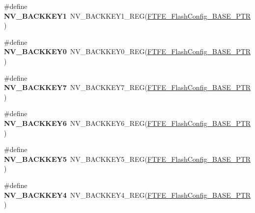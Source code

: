 \begin{DoxyCompactItemize}
\item 
\hypertarget{group___n_v___register___accessor___macros_gae849f8e6eaa76305b07c567463074dc9}{}\#define {\bfseries N\+V\+\_\+\+B\+A\+C\+K\+K\+E\+Y1}~N\+V\+\_\+\+B\+A\+C\+K\+K\+E\+Y1\+\_\+\+R\+E\+G(\hyperlink{group___n_v___peripheral_ga824c84d1d5dcc180128d85f4f676b4c5}{F\+T\+F\+E\+\_\+\+Flash\+Config\+\_\+\+B\+A\+S\+E\+\_\+\+P\+T\+R})\label{group___n_v___register___accessor___macros_gae849f8e6eaa76305b07c567463074dc9}

\item 
\hypertarget{group___n_v___register___accessor___macros_gadb8e2eb4db4de2a485b31c2a1dd393af}{}\#define {\bfseries N\+V\+\_\+\+B\+A\+C\+K\+K\+E\+Y0}~N\+V\+\_\+\+B\+A\+C\+K\+K\+E\+Y0\+\_\+\+R\+E\+G(\hyperlink{group___n_v___peripheral_ga824c84d1d5dcc180128d85f4f676b4c5}{F\+T\+F\+E\+\_\+\+Flash\+Config\+\_\+\+B\+A\+S\+E\+\_\+\+P\+T\+R})\label{group___n_v___register___accessor___macros_gadb8e2eb4db4de2a485b31c2a1dd393af}

\item 
\hypertarget{group___n_v___register___accessor___macros_gaf4c4eb8173a514a0fe632f29e80423d4}{}\#define {\bfseries N\+V\+\_\+\+B\+A\+C\+K\+K\+E\+Y7}~N\+V\+\_\+\+B\+A\+C\+K\+K\+E\+Y7\+\_\+\+R\+E\+G(\hyperlink{group___n_v___peripheral_ga824c84d1d5dcc180128d85f4f676b4c5}{F\+T\+F\+E\+\_\+\+Flash\+Config\+\_\+\+B\+A\+S\+E\+\_\+\+P\+T\+R})\label{group___n_v___register___accessor___macros_gaf4c4eb8173a514a0fe632f29e80423d4}

\item 
\hypertarget{group___n_v___register___accessor___macros_ga74544d83ca29fc4d859726eb023dadb9}{}\#define {\bfseries N\+V\+\_\+\+B\+A\+C\+K\+K\+E\+Y6}~N\+V\+\_\+\+B\+A\+C\+K\+K\+E\+Y6\+\_\+\+R\+E\+G(\hyperlink{group___n_v___peripheral_ga824c84d1d5dcc180128d85f4f676b4c5}{F\+T\+F\+E\+\_\+\+Flash\+Config\+\_\+\+B\+A\+S\+E\+\_\+\+P\+T\+R})\label{group___n_v___register___accessor___macros_ga74544d83ca29fc4d859726eb023dadb9}

\item 
\hypertarget{group___n_v___register___accessor___macros_ga7b8e49b6530c2192672343b7f32ae5e8}{}\#define {\bfseries N\+V\+\_\+\+B\+A\+C\+K\+K\+E\+Y5}~N\+V\+\_\+\+B\+A\+C\+K\+K\+E\+Y5\+\_\+\+R\+E\+G(\hyperlink{group___n_v___peripheral_ga824c84d1d5dcc180128d85f4f676b4c5}{F\+T\+F\+E\+\_\+\+Flash\+Config\+\_\+\+B\+A\+S\+E\+\_\+\+P\+T\+R})\label{group___n_v___register___accessor___macros_ga7b8e49b6530c2192672343b7f32ae5e8}

\item 
\hypertarget{group___n_v___register___accessor___macros_ga5f7ba38a88074b8b658dfe992c73482c}{}\#define {\bfseries N\+V\+\_\+\+B\+A\+C\+K\+K\+E\+Y4}~N\+V\+\_\+\+B\+A\+C\+K\+K\+E\+Y4\+\_\+\+R\+E\+G(\hyperlink{group___n_v___peripheral_ga824c84d1d5dcc180128d85f4f676b4c5}{F\+T\+F\+E\+\_\+\+Flash\+Config\+\_\+\+B\+A\+S\+E\+\_\+\+P\+T\+R})\label{group___n_v___register___accessor___macros_ga5f7ba38a88074b8b658dfe992c73482c}


\end{DoxyCompactItemize}
